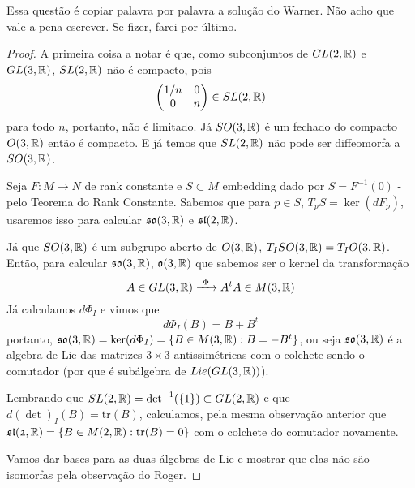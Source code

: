 \begin{exercise}
    \label{prob:l3:3}
    Essa questão é copiar palavra por palavra a solução do Warner. Não acho que vale a pena escrever. Se fizer, farei por último.
\end{exercise}

\begin{exercise}
    \label{prob:l3:4}
\end{exercise}
\begin{proof}
    A primeira coisa a notar é que, como subconjuntos de $GL(2,\mathbb{R})$ e $GL(3,\mathbb{R})$, $SL(2,\mathbb{R})$ não é compacto,
    pois 
    $$\begin{pmatrix}
        1/n & 0 \\
        0 & n \\
    \end{pmatrix} \in SL(2,\mathbb{R})$$
    para todo $n$, portanto, não é limitado. Já $SO(3,\mathbb{R})$ é um fechado do compacto $O(3,\mathbb{R})$ então é compacto. 
    E já temos que $SL(2,\mathbb{R})$ não pode ser diffeomorfa a $SO(3,\mathbb{R})$.

    Seja $F: M \to N$ de rank constante e $S \subset M$ embedding dado por $S = F^{-1}(0)$ - pelo Teorema do Rank Constante.
    Sabemos que para $p \in S$, $T_p S = \ker(dF_p)$, usaremos isso para calcular $\mathfrak{so}(3,\mathbb{R})$ e $\mathfrak{sl}(2,\mathbb{R})$.

    Já que $SO(3,\mathbb{R})$ é um subgrupo aberto de $O(3,\mathbb{R})$, $T_ISO(3,\mathbb{R}) = T_IO(3,\mathbb{R})$. Então, para calcular $\mathfrak{so}(3,\mathbb{R})$,  $\mathfrak{o}(3,\mathbb{R})$ 
    que sabemos ser o kernel da transformação
    $$A \in GL(3,\mathbb{R}) \xrightarrow{\ \Phi\ } A^tA \in M(3,\mathbb{R})$$
    Já calculamos $d\Phi_I$ e vimos que
    $$d\Phi_I(B) = B + B^t$$
    portanto, $\mathfrak{so}(3,\mathbb{R}) = \ker(d\Phi_I) = \{B \in M(3,\mathbb{R}): B = - B^t\}$, 
    ou seja $\mathfrak{so}(3,\mathbb{R})$ é a algebra de Lie das matrizes $3\times 3$ antissimétricas com o colchete 
    sendo o comutador (por que é subálgebra de $Lie(GL(3,\mathbb{R}))$).

    Lembrando que $SL(2,\mathbb{R}) = \det^{-1}(\{1\}) \subset GL(2,\mathbb{R})$ e que $d(\det)_I(B) = \text{tr}(B)$, calculamos, pela mesma observação 
    anterior que $\mathfrak{sl(2,\mathbb{R})} = \{B \in M(2,\mathbb{R}): \text{tr}(B) = 0\}$ com o colchete do comutador novamente.
    
    Vamos dar bases para as duas álgebras de Lie e mostrar que elas não são isomorfas pela observação do Roger.


\end{proof}
